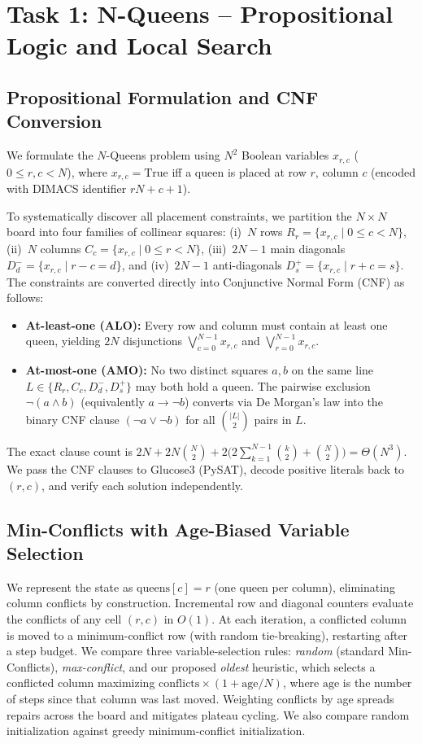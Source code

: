 \section{Task 1: N-Queens -- Propositional Logic and Local Search}

\subsection{Propositional Formulation and CNF Conversion}
We formulate the $N$-Queens problem using $N^2$ Boolean variables $x_{r,c}$ ($0 \le r, c < N$), where $x_{r,c} = \text{True}$ iff a queen is placed at row $r$, column $c$ (encoded with DIMACS identifier $rN + c + 1$).

To systematically discover all placement constraints, we partition the $N\times N$ board into four families of collinear squares: (i)~$N$ rows $R_r = \{x_{r,c} \mid 0 \le c < N\}$, (ii)~$N$ columns $C_c = \{x_{r,c} \mid 0 \le r < N\}$, (iii)~$2N-1$ main diagonals $D^-_d = \{x_{r,c} \mid r - c = d\}$, and (iv)~$2N-1$ anti-diagonals $D^+_s = \{x_{r,c} \mid r + c = s\}$. The constraints are converted directly into Conjunctive Normal Form (CNF) as follows:
\begin{itemize}
  \item \textbf{At-least-one (ALO):} Every row and column must contain at least one queen, yielding $2N$ disjunctions $\bigvee_{c=0}^{N-1} x_{r,c}$ and $\bigvee_{r=0}^{N-1} x_{r,c}$.
  \item \textbf{At-most-one (AMO):} No two distinct squares $a, b$ on the same line $L \in \{R_r, C_c, D^-_d, D^+_s\}$ may both hold a queen. The pairwise exclusion $\neg(a \land b)$ (equivalently $a \rightarrow \neg b$) converts via De Morgan's law into the binary CNF clause $(\neg a \lor \neg b)$ for all $\binom{|L|}{2}$ pairs in $L$.
\end{itemize}
The exact clause count is
$2N + 2N\binom{N}{2} + 2\bigl(2\sum_{k=1}^{N-1}\binom{k}{2}+\binom{N}{2}\bigr) = \Theta(N^3)$.
We pass the CNF clauses to Glucose3 (PySAT), decode positive literals back to $(r, c)$, and verify each solution independently.

\subsection{Min-Conflicts with Age-Biased Variable Selection}
We represent the state as $\text{queens}[c] = r$ (one queen per column), eliminating column conflicts by construction. Incremental row and diagonal counters evaluate the conflicts of any cell $(r,c)$ in $O(1)$. At each iteration, a conflicted column is moved to a minimum-conflict row (with random tie-breaking), restarting after a step budget.
We compare three variable-selection rules: \emph{random} (standard Min-Conflicts), \emph{max-conflict}, and our proposed \emph{oldest} heuristic, which selects a conflicted column maximizing $\text{conflicts} \times (1 + \text{age}/N)$, where $\text{age}$ is the number of steps since that column was last moved. Weighting conflicts by age spreads repairs across the board and mitigates plateau cycling. We also compare random initialization against greedy minimum-conflict initialization.

